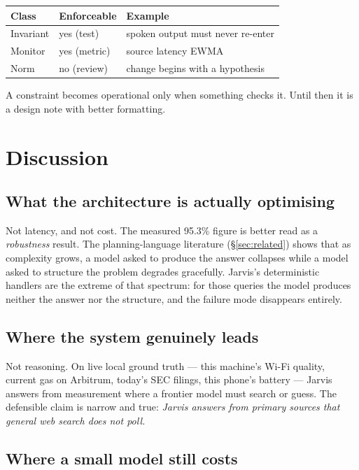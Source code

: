 \documentclass[10pt,twocolumn]{article}
\begin{document}
\begin{table}[h]
\centering\small
\begin{tabular}{@{}lll@{}}
\toprule
\textbf{Class} & \textbf{Enforceable} & \textbf{Example} \\
\midrule
Invariant & yes (test) & spoken output must never re-enter \\
Monitor & yes (metric) & source latency EWMA \\
Norm & no (review) & change begins with a hypothesis \\
\bottomrule
\end{tabular}
\end{table}

A constraint becomes operational only when something checks it. Until then it is a design
note with better formatting.

\section{Discussion}

\subsection{What the architecture is actually optimising}

Not latency, and not cost. The measured 95.3\% figure is better read as a
\emph{robustness} result. The planning-language literature (\S\ref{sec:related}) shows
that as complexity grows, a model asked to produce the answer collapses while a model
asked to structure the problem degrades gracefully. Jarvis's deterministic handlers are
the extreme of that spectrum: for those queries the model produces neither the answer nor
the structure, and the failure mode disappears entirely.

\subsection{Where the system genuinely leads}

Not reasoning. On live local ground truth --- this machine's Wi-Fi quality, current gas on
Arbitrum, today's SEC filings, this phone's battery --- Jarvis answers from measurement
where a frontier model must search or guess. The defensible claim is narrow and true:
\emph{Jarvis answers from primary sources that general web search does not poll.}

\subsection{Where a small model still costs}
\end{document}

